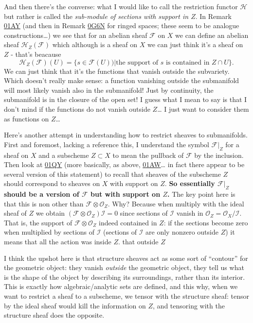 And then there's the converse:
what I would like to call the restriction
functor $\mathcal{H}$
but rather is called the {\it sub-module of
sections with support in $Z$}.
In Remark
\href{https://stacks.math.columbia.edu/tag/%
01AY}{01AY}
(and then in Remark
\href{https://stacks.math.columbia.edu/tag/%
0G6N}{0G6N}
for ringed spaces; these seem to be analogue
constructions…)
we see that for an abelian sheaf
$\mathcal{F}$ on $X$
we can define an abelian sheaf
$\mathcal{H}_Z(\mathcal{F})$
which although is a sheaf on $X$
we can just think it's a sheaf on $Z$ -
that's beacause
$$
\mathcal{H}_Z(\mathcal{F})(U)
=\{s \in \mathcal{F}(U))| \text{the support
of $s$ is contained in }Z\cap U\}.
$$
We can just think that it's the functions
that vanish outside the subvariety.
Which doesn't really make sense:
a function vanishing outside the submanifold
will most likely
vanish also in the submanifold! Just by
continuity,
the submanifold is in the closure of the open
set!
I guess what I mean to say is that I don't
mind if
the functions do not vanish outside $Z$…
I just want to consider them as functions on
$Z$…

\medskip\noindent
Here's another attempt in understanding how
to restrict sheaves to submanifolds.
First and foremost, lacking a reference this,
I understand the symbol $\mathcal{F}|_Z$ for
a sheaf
on $X$ and a subscheme  $Z \subset X$ to mean
the
pullback of $\mathcal{F}$ by the inclusion.
Then look at
\href{https://stacks.math.columbia.edu/tag/%
01QY}{01QY}
(more basically, as above,
\href{https://stacks.math.columbia.edu/tag/%
01AW}{01AW}…
in fact there appear to be several version of
this statement)
to recall that sheaves of the subscheme $Z$
should correspond
to sheaves on $X$ with support on $Z$.
{\bf So essentially $\mathcal{F}|_Z$ should
be a version of $\mathcal{F}$
but with support on $Z$.}
The key point here is that this is non other
than
$\mathcal{F} \otimes \mathcal{O}_Z$.
Why? Because when multiply with the ideal
sheaf of $Z$ we obtain
$(\mathcal{F} \otimes
\mathcal{O}_Z)\mathcal{I}=0$
since sections of $\mathcal{I}$
vanish in
$\mathcal{O}_Z=\mathcal{O}_X/\mathcal{I}$.
That is, the support of $\mathcal{F} \otimes
\mathcal{O}_Z$ indeed
contained in $Z$: if the sections become zero
when
multiplied by sections of $\mathcal{I}$
(sections of $\mathcal{I}$ are only nonzero
outside $Z$)
it means that all the action was inside $Z$.
that outside $Z$

I think the upshot here is that structure
sheaves
act as some sort of ``contour'' for the
geometric object:
they vanish {\it outside} the geometric
object,
they tell us what is the shape of the object
by describing its surroundings, rather than
its interior.
This is exactly how algebraic/analytic sets
are defined,
and this why, when we want to restrict a
sheaf
to a subscheme, we tensor with the structure
sheaf:
tensor by the ideal sheaf would kill the
information on $Z$,
and tensoring with the structure sheaf does
the opposite.














